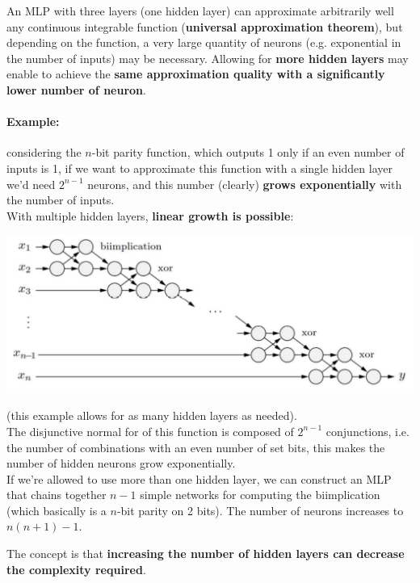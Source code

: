 An MLP with three layers (one hidden layer) can approximate arbitrarily well any continuous integrable function (\textbf{universal approximation theorem}), but depending on the function, a very large quantity of neurons (e.g. exponential in the number of inputs) may be necessary. Allowing for \textbf{more hidden layers} may enable to achieve the \textbf{same approximation quality with a significantly lower number of neuron}.\\

\paragraph{Example:} considering the $n$-bit parity function, which outputs 1 only if an even number of inputs is 1, if we want to approximate this function with a single hidden layer we'd need $2^{n-1}$ neurons, and this number (clearly) \textbf{grows exponentially} with the number of inputs. \\

With multiple hidden layers, \textbf{linear growth is possible}:
\begin{center}
	\includegraphics[width=0.95\columnwidth]{img/NN/nbitparity1}
\end{center}
(this example allows for as many hidden layers as needed).\\
The disjunctive normal for of this function is composed of $2^{n-1}$ conjunctions, i.e. the number of combinations with an even number of set bits, this makes the number of hidden neurons grow exponentially.\\
If we're allowed to use more than one hidden layer, we can construct an MLP that chains together $n-1$ simple networks for computing the biimplication (which basically is a $n$-bit parity on 2 bits). The number of neurons increases to $n(n+1)-1$.

\newpage

The concept is that \textbf{increasing the number of hidden layers can decrease the complexity required}.\\

